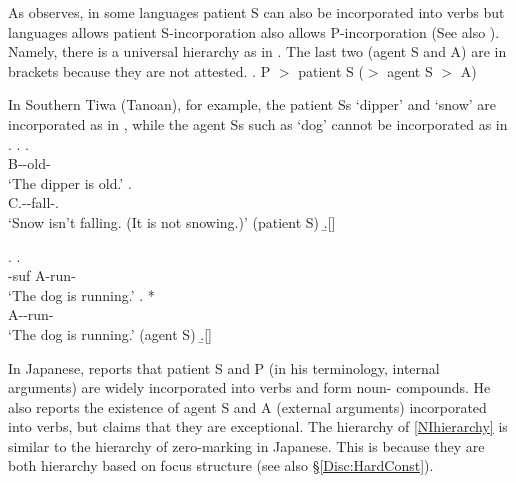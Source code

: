 As  observes,
in some languages patient S can also be incorporated into verbs
but languages allows patient S-incorporation also allows P-incorporation (See also ).%
Namely, there is a universal hierarchy as in \Next.
The last two (agent S and A) are in brackets because
they are not attested.
%
\ex. \label{NIhierarchy}P $>$ patient S ($>$ agent S $>$ A)

In Southern Tiwa (Tanoan), for example,
the patient Ss `dipper' and `snow' are incorporated as in \Next,
while the agent Ss such as `dog' cannot be incorporated as in \NNext.
	\ex. \ag.  \\
			{\sc B}--old- \\
			`The dipper is old.'
		\bg.  \\
			{\sc C}.--fall-. \\
			`Snow isn't falling. (It is not snowing.)'  \hfill{(patient S)}
		\b.[] \hfill{\cite{allenetal84,baker88}}
	
	\ex. \ag.   \\
			-{\sc suf} {\sc A}-run- \\
			`The dog is running.'
		\bg. * \\
			{\sc A}--run- \\
			`The dog is running.'
			\hfill{(agent S)}
		\b.[] \hfill{\cite{allenetal84,baker88}}

In Japanese,
 reports that
patient S and P (in his terminology, internal arguments) are widely incorporated into verbs and form noun- compounds.
He also reports the existence of agent S and A (external arguments) incorporated into verbs,
but claims that they are exceptional.
The hierarchy of  \ref{NIhierarchy} is similar to the hierarchy of zero-marking in Japanese.
This is because
they are both hierarchy based on focus structure (see also \S \ref{Disc:HardConst}).

